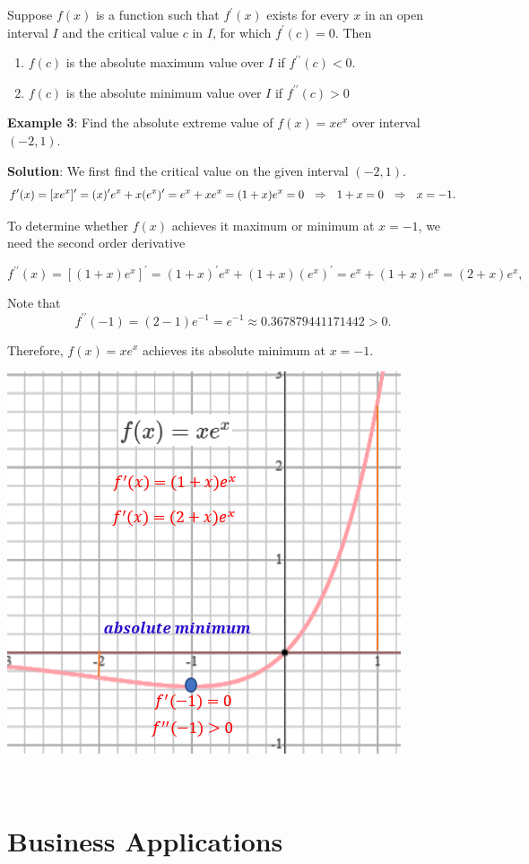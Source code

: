 \documentclass[
]{book}
\begin{document}
Suppose \(f(x)\) is a function such that \(f^\prime(x)\) exists for every \(x\) in an open interval \(I\) and the critical value \(c\) in \(I\), for which \(f^\prime(c) = 0\). Then

\begin{enumerate}
\def\labelenumi{\arabic{enumi}.}
\item
  \(f(c)\) is the absolute maximum value over \(I\) if \(f^{\prime\prime}(c) < 0\).
\item
  \(f(c)\) is the absolute minimum value over \(I\) if \(f^{\prime\prime}(c) > 0\)
\end{enumerate}

\hfill\break
\textbf{Example 3}: Find the absolute extreme value of \(f(x) = xe^x\) over interval \((-2, 1)\).

\textbf{Solution}: We first find the critical value on the given interval \((-2, 1)\).
\[
f^\prime(x) = [xe^x]^\prime = (x)^\prime e^x + x(e^x)^\prime = e^x + xe^x = (1+x)e^x = 0 \\ ~~\Rightarrow ~~ 1 + x = 0~~\Rightarrow~~ x = -1.
\]

To determine whether \(f(x)\) achieves it maximum or minimum at \(x = -1\), we need the second order derivative

\[
f^{\prime\prime}(x) = [(1+x)e^x]^\prime = (1+x)^\prime e^x + (1+x)(e^x)^\prime  = e^x + (1+x)e^x
 = (2+x)e^x,
\]

Note that
\[
f^{\prime\prime}(-1) = (2-1)e^{-1} = e^{-1} \approx 0.367879441171442 > 0.
\]

Therefore, \(f(x) = xe^x\) achieves its absolute minimum at \(x = -1\).

\begin{center}\includegraphics[width=0.5\linewidth]{img09/w09-example03} \end{center}

~

\hypertarget{business-applications-1}{%
\section{Business Applications}\label{business-applications-1}}
\end{document}
